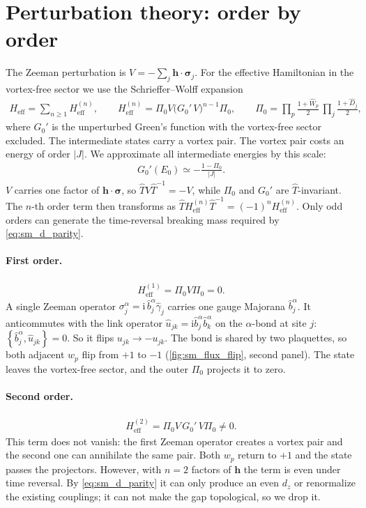 \documentclass[
  aps,
  prl,
  preprint,
  amsmath,
  amssymb,
  superscriptaddress,
  floatfix
]{revtex4-2}
\newcommand{\ii}{\mathrm{i}}
\newcommand{\oga}{\hat \gamma}
\newcommand{\oT}{\hat{T}}
\renewcommand{\abs}[1]{\left| #1 \right|}
\newcommand{\anticomm}[2]{\left\{ #1 , #2 \right\}}
\begin{document}
\section{Perturbation theory: order by order}
\label{sm:orders}

The Zeeman perturbation is $V=-\sum_j\bm h\cdot\bm\sigma_j$. For the effective
Hamiltonian in the vortex-free sector we use the Schrieffer--Wolff
expansion
\begin{align}
  H_{\text{eff}} = \sum_{n\ge1} H^{(n)}_{\text{eff}},
  \qquad
  H^{(n)}_{\text{eff}} = \Pi_0 V \big( G_0'\, V \big)^{n-1} \Pi_0,
  \qquad
  \Pi_0 = \prod_p \frac{1+\hat W_p}{2}\, \prod_j \frac{1+\hat D_j}{2},
\end{align}
where $G_0'$ is the unperturbed Green's function with the vortex-free
sector excluded. The intermediate states carry a vortex pair. The vortex
pair costs an energy of order $\abs{J}$. We approximate all intermediate
energies by this scale:
\begin{align}
  G_0'(E_0) \simeq - \frac{1-\Pi_0}{\abs{J}} .
  \label{eq:sm_G0}
\end{align}
$V$ carries one factor of $\bm h\cdot\bm\sigma$, so $\oT V\oT^{-1}=-V$,
while $\Pi_0$ and $G_0'$ are $\oT$-invariant. The $n$-th order term then
transforms as
$\oT H^{(n)}_{\text{eff}}\oT^{-1}=(-1)^n H^{(n)}_{\text{eff}}$. Only
odd orders can generate the time-reversal breaking mass required by
\cref{eq:sm_d_parity}.

\paragraph{First order.}
\begin{align}
  H^{(1)}_{\text{eff}} = \Pi_0 V \Pi_0 = 0 .
\end{align}
A single Zeeman operator $\sigma_j^\alpha=\ii\,\hat b^\alpha_j\oga_j$
carries one gauge Majorana $\hat b^\alpha_j$. It anticommutes with the
link operator $\hat u_{jk}=\ii\hat b^\alpha_j\hat b^\alpha_k$ on the
$\alpha$-bond at site $j$: $\anticomm{\hat b^\alpha_j}{\hat u_{jk}}=0$. So
it flips $u_{jk}\to-u_{jk}$. The bond is shared by two plaquettes,
so both adjacent $w_p$ flip from $+1$ to $-1$
(\cref{fig:sm_flux_flip}, second panel). The state leaves the
vortex-free sector, and the outer $\Pi_0$ projects it to zero.

\paragraph{Second order.}
\begin{align}
  H^{(2)}_{\text{eff}} = \Pi_0 V\, G_0'\, V \Pi_0 \neq 0 .
\end{align}
This term does not vanish: the first Zeeman operator creates a vortex pair
and the second one can annihilate the same pair. Both $w_p$ return to $+1$
and the state passes the projectors. However, with $n=2$ factors of $\bm h$
the term is even under time reversal. By \cref{eq:sm_d_parity} it can
only produce an even $d_z$ or renormalize the existing couplings; it can not
make the gap topological, so we drop it.
\end{document}
